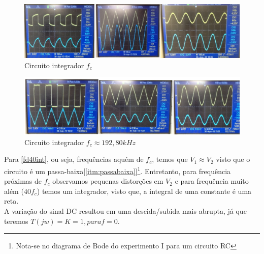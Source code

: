 \documentclass[12pt,letterpaper]{article}
\begin{document}
\begin{enumerate}[I]
\begin{figure}[!htb]
  \centering
  \label{fint}
  \includegraphics[scale=0.32]{img/fint.jpg}
  \caption{Circuito integrador $f_c$}
\end{figure}
\begin{figure}[!htb]
  \centering
  \label{f40int}
  \includegraphics[scale=0.35]{img/f40int.jpg}
  \caption{Circuito integrador $f_c \approx 192,80kHz$}
\end{figure}
Para \ref{fd40int}, ou seja, frequências aquém de $f_c$, temos que $V_1 \approx V_2$ visto que o circuito é um passa-baixa[\ref{itm:passabaixa}]\footnote{Nota-se no diagrama de Bode do experimento I para um circuito RC}. Entretanto, para frequência próximas de $f_c$ observamos pequenas distorções em $V_2$ e para frequência muito além ($40f_c$) temos um integrador, visto que, a integral de uma constante é uma reta. \\
A variação do sinal DC resultou em uma descida/subida mais abrupta, já que teremos $T(jw) = K = 1, para f = 0$.
\end{enumerate}
\end{document}
